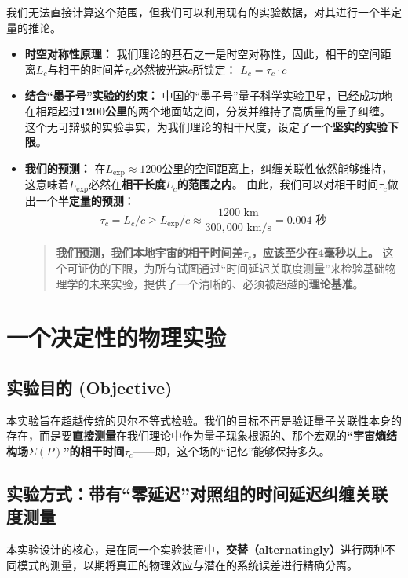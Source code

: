 \documentclass[12pt]{article}
\begin{document}
我们无法直接计算这个范围，但我们可以利用现有的实验数据，对其进行一个半定量的推论。

\begin{itemize}
    \item   \textbf{时空对称性原理：} 我们理论的基石之一是时空对称性，因此，相干的空间距离$L_c$与相干的时间差$\tau_c$必然被光速$c$所锁定：
    \textbf{$L_c = \tau_c \cdot c$}

    \item   \textbf{结合``墨子号''实验的约束：}
    中国的``墨子号''量子科学实验卫星，已经成功地在相距超过\textbf{1200公里}的两个地面站之间，分发并维持了高质量的量子纠缠。
    这个无可辩驳的实验事实，为我们理论的相干尺度，设定了一个\textbf{坚实的实验下限}。

    \item   \textbf{我们的预测：}
    在$L_{\text{exp}} \approx 1200$公里的空间距离上，纠缠关联性依然能够维持，这意味着$L_{\text{exp}}$必然在\textbf{相干长度$L_c$的范围之内}。
    由此，我们可以对相干时间$\tau_c$做出一个\textbf{半定量的预测}：
    \[ \tau_c = L_c / c \geq L_{\text{exp}} / c \approx \frac{1200 \text{ km}}{300,000 \text{ km/s}} = 0.004 \text{ 秒} \]
    
    \begin{quote}
        \textbf{我们预测，我们本地宇宙的相干时间差$\tau_c$，应该至少在4毫秒以上。} 这个可证伪的下限，为所有试图通过``时间延迟关联度测量''来检验基础物理学的未来实验，提供了一个清晰的、必须被超越的\textbf{理论基准}。
    \end{quote}
\end{itemize}



\section{一个决定性的物理实验}

\subsection{实验目的 (Objective)}
本实验旨在超越传统的贝尔不等式检验。我们的目标不再是验证量子关联性本身的存在，而是要\textbf{直接测量}在我们理论中作为量子现象根源的、那个宏观的\textbf{``宇宙熵结构场$\Sigma(P)$''的相干时间$\tau_c$}——即，这个场的``记忆''能够保持多久。

\subsection{实验方式：带有``零延迟''对照组的时间延迟纠缠关联度测量}
本实验设计的核心，是在同一个实验装置中，\textbf{交替（alternatingly）}进行两种不同模式的测量，以期将真正的物理效应与潜在的系统误差进行精确分离。
\end{document}
